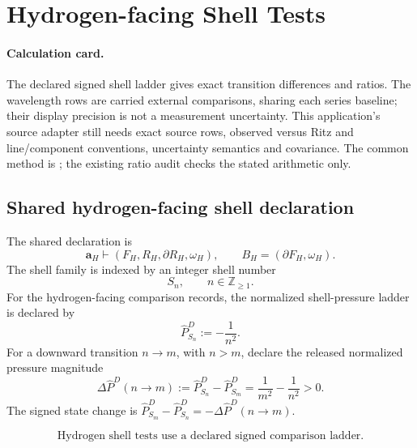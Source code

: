 \section{Hydrogen-facing Shell Tests}\label{manual:hydrogen-shell-tests}

\paragraph{Calculation card.}
The declared signed shell ladder gives exact transition differences and
ratios. The wavelength rows are carried external comparisons, sharing each
series baseline; their display precision is not a measurement uncertainty.
This application's source adapter still needs exact source rows, observed
versus Ritz and line/component conventions, uncertainty semantics and
covariance. The common method is ; the
existing ratio audit checks the stated arithmetic only.



\subsection{Shared hydrogen-facing shell declaration}\label{manual:hydrogen:scope}

The shared declaration is
\[
\mathbf a_H\vdash(F_H,R_H,\partial R_H,\omega_H),
\qquad
B_H=(\partial F_H,\omega_H).
\]
The shell family is indexed by an integer shell number
\[
S_n,
\qquad
n\in\mathbb Z_{\ge 1}.
\]
For the hydrogen-facing comparison records, the normalized shell-pressure ladder is declared by
\[
\widehat P^D_{S_n}:=-\frac{1}{n^2}.
\]
For a downward transition \(n\to m\), with \(n>m\), declare the released normalized pressure magnitude
\[
\Delta \widehat P^D(n\to m)
:=
\widehat P^D_{S_n}-\widehat P^D_{S_m}
=
\frac{1}{m^2}-\frac{1}{n^2}>0.
\]
The signed state change is \(\widehat P^D_{S_m}-\widehat P^D_{S_n}=-\Delta\widehat P^D(n\to m)\).


\[
\boxed{\text{Hydrogen shell tests use a declared signed comparison ladder.}}
\]

